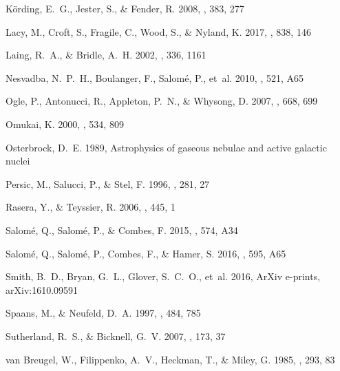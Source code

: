 \documentclass{aastex6}
\begin{document}
\begin{thebibliography}{}
{K{\"o}rding}, E.~G., {Jester}, S., \& {Fender}, R. 2008, \mnras, 383, 277

{Lacy}, M., {Croft}, S., {Fragile}, C., {Wood}, S., \& {Nyland}, K. 2017, \apj,
  838, 146

{Laing}, R.~A., \& {Bridle}, A.~H. 2002, \mnras, 336, 1161

{Nesvadba}, N.~P.~H., {Boulanger}, F., {Salom{\'e}}, P., {et~al.} 2010, \aap,
  521, A65

{Ogle}, P., {Antonucci}, R., {Appleton}, P.~N., \& {Whysong}, D. 2007, \apj,
  668, 699

{Omukai}, K. 2000, \apj, 534, 809

{Osterbrock}, D.~E. 1989, {Astrophysics of gaseous nebulae and active galactic
  nuclei}

{Persic}, M., {Salucci}, P., \& {Stel}, F. 1996, \mnras, 281, 27

{Rasera}, Y., \& {Teyssier}, R. 2006, \aap, 445, 1

{Salom{\'e}}, Q., {Salom{\'e}}, P., \& {Combes}, F. 2015, \aap, 574, A34

{Salom{\'e}}, Q., {Salom{\'e}}, P., {Combes}, F., \& {Hamer}, S. 2016, \aap,
  595, A65

{Smith}, B.~D., {Bryan}, G.~L., {Glover}, S.~C.~O., {et~al.} 2016, ArXiv
  e-prints, arXiv:1610.09591

{Spaans}, M., \& {Neufeld}, D.~A. 1997, \apj, 484, 785

{Sutherland}, R.~S., \& {Bicknell}, G.~V. 2007, \apjs, 173, 37

{van Breugel}, W., {Filippenko}, A.~V., {Heckman}, T., \& {Miley}, G. 1985,
  \apj, 293, 83

\end{thebibliography}
\end{document}
